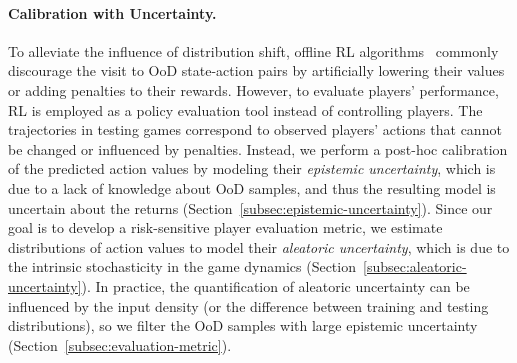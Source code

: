 \documentclass{article}
\newcommand{\dataset}{\mathcal{D}}
\begin{document}

\paragraph{Calibration with Uncertainty.}
To alleviate the influence of distribution shift, offline RL algorithms~\cite{Levine2020OfflineRL} commonly discourage the visit to OoD state-action pairs by artificially lowering their values or adding penalties to their rewards. However, to evaluate players' performance, RL is employed as a policy evaluation tool instead of controlling players. The trajectories in testing games correspond to observed players' actions that cannot be changed or influenced by penalties. Instead, we perform a post-hoc calibration of the predicted action values by modeling their {\it epistemic uncertainty}, which is due to a lack of knowledge about OoD samples, and thus the resulting model is uncertain about the returns (Section~\ref{subsec:epistemic-uncertainty}). Since our goal is to develop a risk-sensitive player evaluation metric, we estimate distributions of action values to model their {\it aleatoric uncertainty}, which is due to the intrinsic stochasticity in the game dynamics (Section~\ref{subsec:aleatoric-uncertainty}).
In practice, the quantification of aleatoric uncertainty can be influenced by the input density (or the difference between training and testing distributions), so we filter the OoD samples with large epistemic uncertainty (Section~\ref{subsec:evaluation-metric}).
\end{document}
